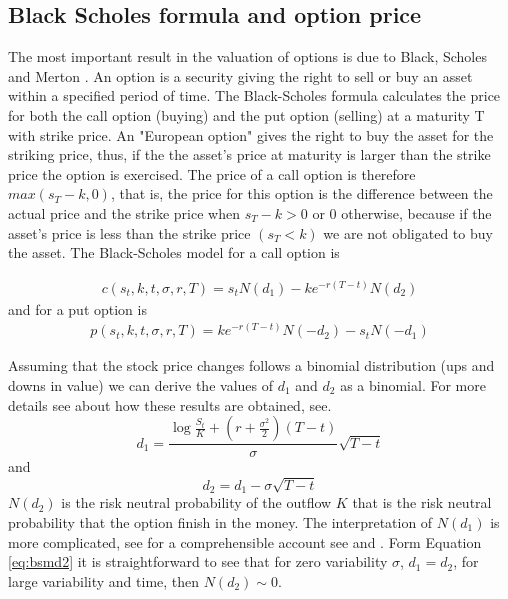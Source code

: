 \documentclass[11pt,twocolumn]{article}
\begin{document}
\subsection*{Black Scholes formula and option price}
The most important result in the valuation of options is due to Black, Scholes and Merton \citep{black_pricing_1973}. An option is a security giving the right to sell or buy an asset within a specified period of time. The Black-Scholes formula calculates the price for both the call option (buying) and the put option (selling) at a maturity T with strike price. An "European option" gives the right to buy the asset for the striking price, thus, if the the asset's price at maturity is larger than the strike price the option is exercised. The price of a call option is therefore $max(s_T - k, 0)$, that is, the price for this option is the difference between the actual price and the strike price when $s_T - k >0$ or 0 otherwise, because if the asset's price is less than the strike price $(s_T < k)$ we are not obligated to buy the asset. 
The Black-Scholes model for a call option is

\begin{equation}
\begin{split}
 c(s_t,k,t,\sigma,r,T)  = s_t N(d_1) - k e^{-r(T-t)}N(d_2)
 \end{split}
  \label{eq:bsmcall}
\end{equation}
and for a put option is
 \begin{equation}
\begin{split}
 p(s_t,k,t,\sigma,r,T)  = ke^{-r(T-t)}N(-d_2)- s_tN(-d_1)
 \end{split}
  \label{eq:bsmput}
 \end{equation}
 
Assuming that the stock price changes follows a binomial distribution (ups and downs in value) we can derive the values of $d_1$ and $d_2$ as a binomial. For more details see about how these results are obtained, see\citep{hull_options_2011}.
 \begin{equation}
 d_1 =  \frac{\log \frac{S_t}{K} + (r + \frac{\sigma^2}{2})(T-t)  }\sigma \sqrt{T-t}{}
 \label{eq:bsmd1}
 \end{equation}
 and 
 \begin{equation}
 d_2 = d_1 - \sigma \sqrt{T-t}{}
 \label{eq:bsmd2}
 \end{equation}
$N(d_2)$ is the risk neutral probability of the outflow $K$ that is the risk neutral probability that the option finish in the money. %
The interpretation of $N(d_1)$ is more complicated, see \citep{} for a comprehensible account see \citep{hull_options_2005} and \citep{duffie_dynamic_2001}. 
Form Equation \ref{eq:bsmd2} it is straightforward to see that for zero variability $\sigma$, $d_1 = d_2$, for large variability and time, then $N(d_2)\sim 0$.  
\end{document}
